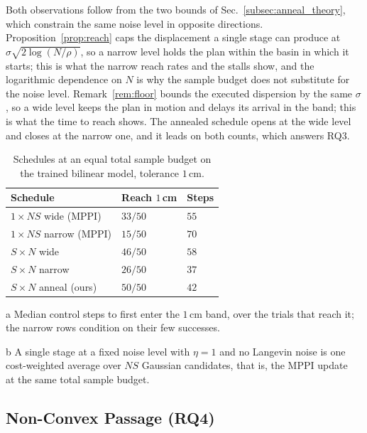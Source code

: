 \documentclass[letterpaper,10pt,conference]{ieeeconf}
\begin{document}
Both observations follow from the two bounds of Sec.~\ref{subsec:anneal_theory}, which constrain the same noise level in opposite directions.
Proposition~\ref{prop:reach} caps the displacement a single stage can produce at $\sigma \sqrt{2 \log(N/\rho)}$, so a narrow level holds the plan within the basin in which it starts; this is what the narrow reach rates and the stalls show, and the logarithmic dependence on $N$ is why the sample budget does not substitute for the noise level.
Remark~\ref{rem:floor} bounds the executed dispersion by the same $\sigma$, so a wide level keeps the plan in motion and delays its arrival in the band; this is what the time to reach shows.
The annealed schedule opens at the wide level and closes at the narrow one, and it leads on both counts, which answers RQ3.

\begin{table}[t]
\centering
\begin{threeparttable}
\caption{Schedules at an equal total sample budget on the trained bilinear model, tolerance $1$\,cm.}
\label{tab:anneal}
\footnotesize
\begin{tabularx}{\linewidth}{l Y Y}
\toprule
Schedule & Reach $1$\,cm & Steps \\
\midrule
$1 \times NS$ wide (MPPI) & $33/50$ & $55$ \\
$1 \times NS$ narrow (MPPI) & $15/50$ & $70$ \\
$S \times N$ wide & $46/50$ & $58$ \\
$S \times N$ narrow & $26/50$ & $37$ \\
$S \times N$ anneal (ours) & $50/50$ & $42$ \\
\bottomrule
\end{tabularx}
\begin{tablenotes}[flushleft]\scriptsize
\item[a] Median control steps to first enter the $1$\,cm band, over the trials
that reach it; the narrow rows condition on their few successes.
\item[b] A single stage at a fixed noise level with $\eta = 1$ and no Langevin
noise is one cost-weighted average over $NS$ Gaussian candidates, that is, the
MPPI update~\cite{williams2017mppi} at the same total sample budget.
\end{tablenotes}
\end{threeparttable}
\end{table}


\subsection{Non-Convex Passage (RQ4)}\label{subsec:exp_window}
\end{document}
